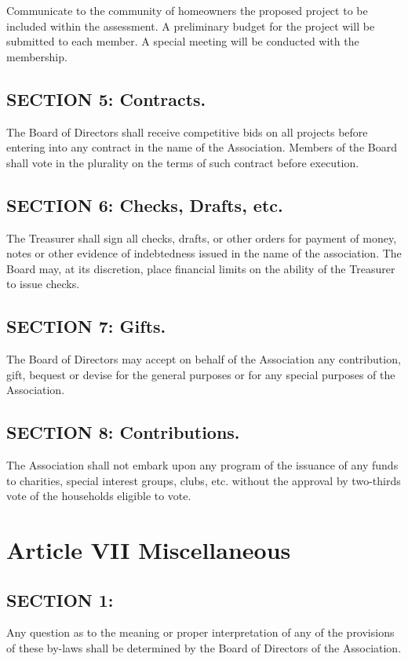 Communicate to the community of homeowners the proposed project to be
included within the assessment.  A preliminary budget for the project
will be submitted to each member.  A special meeting will be conducted
with the membership.

\subsection{SECTION 5: Contracts.}
The Board of Directors shall receive competitive bids on all projects
before entering into any contract in the name of the Association. Members
of the Board shall vote in the plurality on the terms of such contract
before execution.

\subsection{SECTION 6: Checks, Drafts, etc.}
The Treasurer shall sign all checks, drafts, or other orders for payment
of money, notes or other evidence of indebtedness issued in the name
of the association. The Board may, at its discretion, place financial
limits on the ability of the Treasurer to issue checks.

\subsection{SECTION 7: Gifts.}
The Board of Directors may accept on behalf of the Association any
contribution, gift, bequest or devise for the general purposes or for
any special purposes of the Association.

\subsection{SECTION 8: Contributions.}
The Association shall not embark upon any program of the issuance of
any funds to charities, special interest groups, clubs, etc. without
the approval by two-thirds vote of the households eligible to vote.

\section{Article VII Miscellaneous}

\subsection{SECTION 1:}
Any question as to the meaning or proper interpretation of any of the
provisions of these by-laws shall be determined by the Board of Directors
of the Association.

